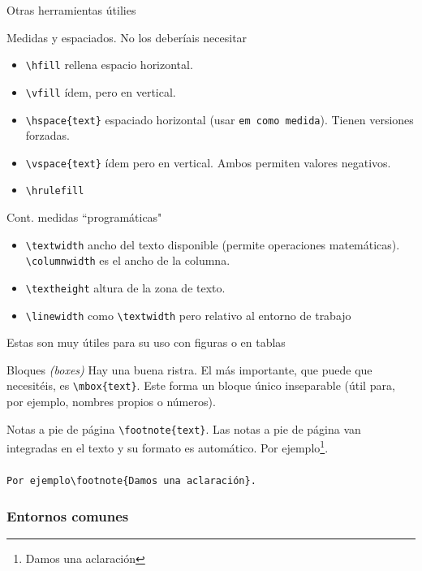 \documentclass[12pt]{beamer}
\begin{document}
\begin{frame}{Otras herramientas útilies}
	\begin{block}{Medidas y espaciados. No los deberíais necesitar}
		\begin{itemize}
			\item \verb|\hfill| rellena espacio horizontal.
			\item \verb|\vfill| ídem, pero en vertical.
			\item \verb|\hspace{text}| espaciado horizontal (usar \texttt{em como medida}). Tienen versiones forzadas.
			\item \verb|\vspace{text}| ídem pero en vertical. Ambos permiten valores negativos.
			\item \verb|\hrulefill|
		\end{itemize}
		\hrulefill
	\end{block}
	\begin{block}{Cont. medidas ``programáticas"}
		\begin{itemize}
			\item \verb|\textwidth| ancho del texto disponible (permite operaciones matemáticas). \verb|\columnwidth| es el ancho de la columna.
			\item \verb|\textheight| altura de la zona de texto.
			\item \verb|\linewidth| como \verb|\textwidth| pero relativo al entorno de trabajo
		\end{itemize}
	Estas son muy útiles para su uso con figuras o en tablas
	\end{block}
	\begin{block}{Bloques \textit{(boxes)}}
		Hay una buena ristra. El más importante, que puede que necesitéis, es \verb|\mbox{text}|. Este forma un bloque único inseparable (útil para, por ejemplo, nombres propios o números).
	\end{block}
	\begin{block}{Notas a pie de página}
		\verb|\footnote{text}|. Las notas a pie de página van integradas en el texto y su formato es automático. Por ejemplo\footnote{Damos una aclaración}. \\ \hrulefill \\
		\verb|Por ejemplo\footnote{Damos una aclaración}.|
	\end{block}
\end{frame}

\subsubsection{Entornos comunes}
\end{document}
